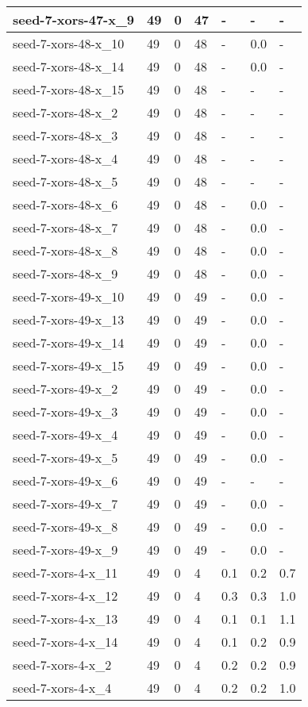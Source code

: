 \begin{scriptsize}
\begin{longtable}{|p{5cm}|l|l|l|l|l|l|}
seed-7-xors-47-x\_9&49&0&47&-&-&- \\ \hline 
seed-7-xors-48-x\_10&49&0&48&-&0.0&- \\ \hline 
seed-7-xors-48-x\_14&49&0&48&-&0.0&- \\ \hline 
seed-7-xors-48-x\_15&49&0&48&-&-&- \\ \hline 
seed-7-xors-48-x\_2&49&0&48&-&-&- \\ \hline 
seed-7-xors-48-x\_3&49&0&48&-&-&- \\ \hline 
seed-7-xors-48-x\_4&49&0&48&-&-&- \\ \hline 
seed-7-xors-48-x\_5&49&0&48&-&-&- \\ \hline 
seed-7-xors-48-x\_6&49&0&48&-&0.0&- \\ \hline 
seed-7-xors-48-x\_7&49&0&48&-&0.0&- \\ \hline 
seed-7-xors-48-x\_8&49&0&48&-&0.0&- \\ \hline 
seed-7-xors-48-x\_9&49&0&48&-&0.0&- \\ \hline 
seed-7-xors-49-x\_10&49&0&49&-&0.0&- \\ \hline 
seed-7-xors-49-x\_13&49&0&49&-&0.0&- \\ \hline 
seed-7-xors-49-x\_14&49&0&49&-&0.0&- \\ \hline 
seed-7-xors-49-x\_15&49&0&49&-&0.0&- \\ \hline 
seed-7-xors-49-x\_2&49&0&49&-&0.0&- \\ \hline 
seed-7-xors-49-x\_3&49&0&49&-&0.0&- \\ \hline 
seed-7-xors-49-x\_4&49&0&49&-&0.0&- \\ \hline 
seed-7-xors-49-x\_5&49&0&49&-&0.0&- \\ \hline 
seed-7-xors-49-x\_6&49&0&49&-&-&- \\ \hline 
seed-7-xors-49-x\_7&49&0&49&-&0.0&- \\ \hline 
seed-7-xors-49-x\_8&49&0&49&-&0.0&- \\ \hline 
seed-7-xors-49-x\_9&49&0&49&-&0.0&- \\ \hline 
seed-7-xors-4-x\_11&49&0&4&0.1&0.2&0.7 \\ \hline 
seed-7-xors-4-x\_12&49&0&4&0.3&0.3&1.0 \\ \hline 
seed-7-xors-4-x\_13&49&0&4&0.1&0.1&1.1 \\ \hline 
seed-7-xors-4-x\_14&49&0&4&0.1&0.2&0.9 \\ \hline 
seed-7-xors-4-x\_2&49&0&4&0.2&0.2&0.9 \\ \hline 
seed-7-xors-4-x\_4&49&0&4&0.2&0.2&1.0 \\ \hline 

\end{longtable}
\end{scriptsize}
